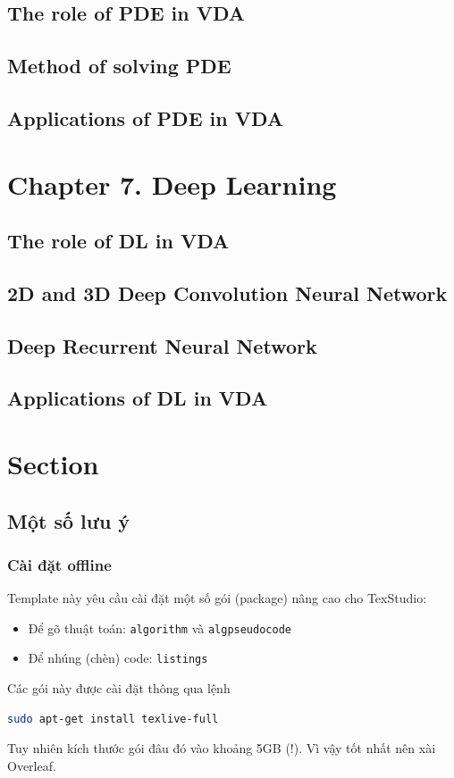\subsection{The role of PDE in VDA}
\subsection{Method of solving PDE}
\subsection{Applications of PDE in VDA}

\section{Chapter 7. Deep Learning}
\subsection{The role of DL in VDA}
\subsection{2D and 3D Deep Convolution Neural Network}
\subsection{Deep Recurrent Neural Network}
\subsection{Applications of DL in VDA}

% 











\section{Section}

\subsection{Một số lưu ý}

\subsubsection{Cài đặt offline}
Template này yêu cầu cài đặt một số gói (package) nâng cao cho TexStudio:
\begin{itemize}
\item Để gõ thuật toán: \texttt{algorithm} và \texttt{algpseudocode}
\item Để nhúng (chèn) code: \texttt{listings}
\end{itemize}
Các gói này được cài đặt thông qua lệnh
\begin{lstlisting}[language=sh]
sudo apt-get install texlive-full
\end{lstlisting}
Tuy nhiên kích thước gói đâu đó vào khoảng 5GB (!). Vì vậy tốt nhất nên xài Overleaf.

